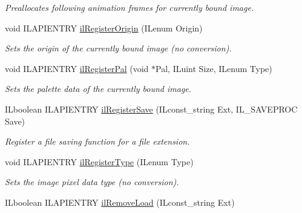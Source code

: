 \begin{DoxyCompactItemize}
\begin{DoxyCompactList}\small\item\em Preallocates following animation frames for currently bound image. \end{DoxyCompactList}\item 
void I\+L\+A\+P\+I\+E\+N\+T\+R\+Y \hyperlink{group__register_ga79cd7bac1b68d6e78fa585fb57754b97}{il\+Register\+Origin} (I\+Lenum Origin)
\begin{DoxyCompactList}\small\item\em Sets the origin of the currently bound image (no conversion). \end{DoxyCompactList}\item 
\hypertarget{group__register_ga66dfc863bb20e62978f3fe613a8de007}{void I\+L\+A\+P\+I\+E\+N\+T\+R\+Y \hyperlink{group__register_ga66dfc863bb20e62978f3fe613a8de007}{il\+Register\+Pal} (void $\ast$Pal, I\+Luint Size, I\+Lenum Type)}\label{group__register_ga66dfc863bb20e62978f3fe613a8de007}

\begin{DoxyCompactList}\small\item\em Sets the palette data of the currently bound image. \end{DoxyCompactList}\item 
\hypertarget{group__register_ga9e630bbaa6a19e4f0a2438bd552ee563}{I\+Lboolean I\+L\+A\+P\+I\+E\+N\+T\+R\+Y \hyperlink{group__register_ga9e630bbaa6a19e4f0a2438bd552ee563}{il\+Register\+Save} (I\+Lconst\+\_\+string Ext, I\+L\+\_\+\+S\+A\+V\+E\+P\+R\+O\+C Save)}\label{group__register_ga9e630bbaa6a19e4f0a2438bd552ee563}

\begin{DoxyCompactList}\small\item\em Register a file saving function for a file extension. \end{DoxyCompactList}\item 
void I\+L\+A\+P\+I\+E\+N\+T\+R\+Y \hyperlink{group__register_gac327753a4ba7fa0e4aa04ee8a351d619}{il\+Register\+Type} (I\+Lenum Type)
\begin{DoxyCompactList}\small\item\em Sets the image pixel data type (no conversion). \end{DoxyCompactList}\item 
\hypertarget{group__register_ga388f0a90bbfee28bc2bebf0dd2b336e2}{I\+Lboolean I\+L\+A\+P\+I\+E\+N\+T\+R\+Y \hyperlink{group__register_ga388f0a90bbfee28bc2bebf0dd2b336e2}{il\+Remove\+Load} (I\+Lconst\+\_\+string Ext)}\label{group__register_ga388f0a90bbfee28bc2bebf0dd2b336e2}


\end{DoxyCompactItemize}
